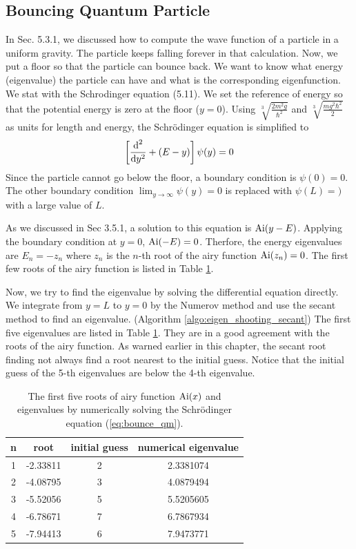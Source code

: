 \subsection{Bouncing Quantum Particle}\label{sec:bounce_qm}


In Sec. 5.3.1, we discussed how to compute the wave function of a particle in a uniform gravity.
The particle keeps falling forever in that calculation.  Now, we put a floor so that the particle can bounce back.  We want to know what energy (eigenvalue) the particle can have and what is the corresponding eigenfunction.  We stat with the Schrodinger equation (5.11).  We set the reference of energy  so that the potential energy is zero at the floor ($y=0$). Using $\sqrt[3]{\displaystyle\frac{2m^2 g}{\hbar^2}}$ and $\sqrt[3]{\displaystyle\frac{m g^2 \hbar^2}{2}}$ as units for length and energy, the Schr\"{o}dinger equation is simplified to
\begin{equation}\label{eq:bounce_qm}
\left [ \frac{\text{d}^2}{\text{d} y^2}+ (E-y) \right ] \psi(y) = 0
\end{equation}
Since the particle cannot go below the floor, a boundary condition is $\psi(0)=0$.  The other boundary condition $\displaystyle\lim_{y \rightarrow \infty} \psi(y) = 0$ is replaced with $\psi(L)=)$ with a large value of $L$.

As we discussed in Sec 3.5.1, a solution to this equation is $\operatorname{Ai} (y-E)$. Applying the boundary condition at $y=0$, $\operatorname{Ai}(-E)=0$.  Therfore, the energy eigenvalues are $E_n=-z_n$ where $z_n$ is the $n$-th root of the airy function $\operatorname{Ai}(z_n)=0$. The first few roots of the airy function is listed in Table \ref{tbl:airy_roots}.

Now, we try to find the eigenvalue by solving the differential equation directly.  We integrate from  $y=L$ to $y=0$ by the Numerov method and use the secant method to find an eigenvalue. (Algorithm \ref{algo:eigen_shooting_secant})  The first five eigenvalues are listed in Table \ref{tbl:airy_roots}.  They are in a good agreement with the roots of the airy function.  As warned earlier in this chapter, the secant root finding not always find a root nearest to the initial guess.  Notice that the initial guess of the 5-th eigenvalues are below the 4-th eigenvalue.  

\begin{table}
\centering
\begin{tabular}{c|c|c|c}
\hline
n & root & initial guess & numerical eigenvalue\\
\hline
1 & -2.33811&2&2.3381074\\
2 & -4.08795&3&4.0879494\\
3 & -5.52056&5&5.5205605\\
4 & -6.78671&7&6.7867934\\
5 & -7.94413&6&7.9473771\\
\hline
\end{tabular}
\caption{The first five roots of airy function $\operatorname{Ai}(x)$ and eigenvalues by numerically solving the Schr\"{o}dinger equation (\ref{eq:bounce_qm}).}
\label{tbl:airy_roots}
\end{table}

